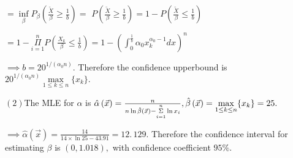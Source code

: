 \documentclass{article}
\begin{document}
$=\underset{\beta }{\inf }P_{\beta }\left( \frac{\tilde{X}}{\beta }\geq 
\frac{1}{b}\right) =$ $P\left( \frac{\tilde{X}}{\beta }\geq \frac{1}{b}%
\right) =1-P\left( \frac{\tilde{X}}{\beta }\leq \frac{1}{b}\right) $

$=1-\underset{i=1}{\overset{n}{\Pi }}P\left( \frac{X_{k}}{\beta }\leq \frac{1%
}{b}\right) =1-\left( \int_{0}^{\frac{1}{b}}\alpha _{0}x_{k}^{\alpha
_{0}-1}dx\right) ^{n}$

$\implies b=20^{1/(\alpha _{0}n)}.$ Therefore the confidence upperbound is $%
20^{1/(\alpha _{0}n)}\underset{1\leq k\leq n}{\max }\{x_{k}\}.$

$\left( 2\right) $The MLE for $\alpha $ is $\hat{\alpha}\left( \vec{x}%
\right) =\frac{n}{n\ln \hat{\beta}\left( \vec{x}\right) -\underset{i=1}{%
\overset{n}{\Sigma }}\ln x_{i}},\hat{\beta}\left( \vec{x}\right) =\underset{%
1\leq k\leq n}{\max }\{x_{k}\}=25.$

$\implies \hat{\alpha}\left( \vec{x}\right) =\frac{14}{14\times \ln 25-43.91}%
=\allowbreak 12.\,\allowbreak 129.$ Therefore the confidence interval for
estimating $\beta $ is $\left( 0,1.018\right) ,$ with confidence coefficient 
$95\%.$
\end{document}
